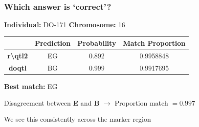 \documentclass[12pt,t]{beamer}
\begin{document}
	\begin{frame}
		\frametitle{Which answer is `correct'?}
		\vspace{0.3in}
		\pause \textbf{Individual:} DO-171 \qquad \textbf{Chromosome:} 16 \\
		\pause	
		\begin{table}[]
			\centering
			\begin{tabular}{|c|c|c|c|}
				\hline
		                              & \textbf{Prediction} & \textbf{Probability} & \textbf{Match Proportion} \\ \hline
				\textbf{r\textbackslash qtl2} & EG                  & 0.892                & 0.9958848                 \\ \hline
				\textbf{doqtl}                & BG                  & 0.999                & 0.9917695                 \\ \hline
			\end{tabular}
		\end{table}

		\pause \textbf{Best match:} EG \newline
			
		\pause Disagreement between \textbf{E} and \textbf{B} \pause $\rightarrow$ Proportion match $=0.997$ \newline
		
		\pause We see this consistently across the marker region
	
	\end{frame}
	
\end{document}
